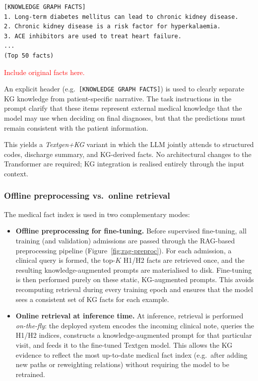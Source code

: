 \begin{verbatim}
[KNOWLEDGE GRAPH FACTS]
1. Long-term diabetes mellitus can lead to chronic kidney disease.
2. Chronic kidney disease is a risk factor for hyperkalaemia.
3. ACE inhibitors are used to treat heart failure.
...
(Top 50 facts)
\end{verbatim}

\textcolor{red}{Include original facts here.}

An explicit header (e.g.\ \texttt{[KNOWLEDGE GRAPH FACTS]}) is used to clearly separate KG knowledge from patient-specific narrative. The task instructions in the prompt clarify that these items represent external medical knowledge that the model may use when deciding on final diagnoses, but that the predictions must remain consistent with the patient information.

This yields a \emph{Textgen+KG} variant in which the LLM jointly attends to structured codes, discharge summary, and KG-derived facts. No architectural changes to the Transformer are required; KG integration is realised entirely through the input context.

\subsubsection{Offline preprocessing vs.\ online retrieval}
\label{subsubsec:offline-online-rag}

The medical fact index is used in two complementary modes:

\begin{itemize}
    \item \textbf{Offline preprocessing for fine-tuning.} Before supervised fine-tuning, all training (and validation) admissions are passed through the RAG-based preprocessing pipeline (Figure~\ref{fig:rag-preproc}). For each admission, a clinical query is formed, the top-$K$ H1/H2 facts are retrieved once, and the resulting knowledge-augmented prompts are materialised to disk. Fine-tuning is then performed purely on these static, KG-augmented prompts. This avoids recomputing retrieval during every training epoch and ensures that the model sees a consistent set of KG facts for each example.

    \item \textbf{Online retrieval at inference time.} At inference, retrieval is performed \emph{on-the-fly}: the deployed system encodes the incoming clinical note, queries the H1/H2 indices, constructs a knowledge-augmented prompt for that particular visit, and feeds it to the fine-tuned Textgen model. This allows the KG evidence to reflect the most up-to-date medical fact index (e.g.\ after adding new paths or reweighting relations) without requiring the model to be retrained.
\end{itemize}

